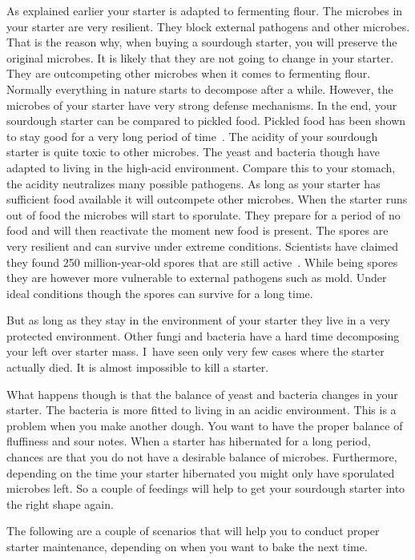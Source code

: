 As explained earlier your starter is adapted
to fermenting flour. The microbes in your starter are very resilient. They
block external pathogens and other microbes. That is the reason why, when
buying a sourdough starter, you will preserve the original microbes. It is
likely that they are not going to change in your starter. They are outcompeting other
microbes when it comes to fermenting flour. Normally everything in nature
starts to decompose after a while. However, the microbes of your starter have
very strong defense mechanisms. In the end, your sourdough starter can be
compared to pickled food. Pickled food has been shown to stay good for a very
long period of time~\cite{pickled+foods+expiration}. The acidity of your sourdough starter is quite
toxic to other microbes. The yeast and bacteria though have adapted to living
in the high-acid environment. Compare this to your stomach, the acidity
neutralizes many possible pathogens. As long as your starter has sufficient
food available it will outcompete other microbes. When the starter runs out of
food the microbes will start to sporulate. They prepare for a period of no
food and will then reactivate the moment new food is present. The
spores are very resilient and can survive under extreme conditions.
Scientists have claimed they found 250 million-year-old spores that are still
active~\cite{old+spores}. While being spores
they are however more vulnerable to external pathogens such as mold.
Under ideal conditions though the spores can survive for a
long time.

But as long as they stay in the environment of your starter they live
in a very protected environment. Other fungi and bacteria have a hard time decomposing your left over starter mass.
I~have seen only very few cases where the starter actually died. It is almost impossible
to kill a starter.

What happens though is that the balance of yeast and
bacteria changes in your starter. The bacteria is more fitted to living
in an acidic environment. This is a problem when you make another dough.
You want to have the proper balance of fluffiness and sour notes.
When a starter has hibernated for a long period, chances are that
you do not have a desirable balance of microbes.
Furthermore, depending on the time your starter hibernated you might only have
sporulated microbes left. So a couple of feedings will help to get your
sourdough starter into the right shape again.

The following are a couple of scenarios that will help you to conduct proper
starter maintenance, depending on when you want to bake the next time.

